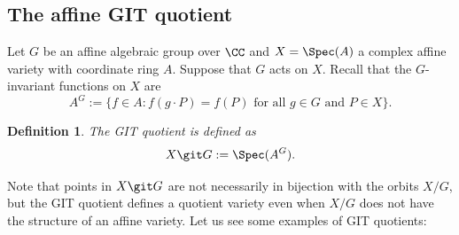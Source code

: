 \documentclass[12pt]{amsart}
\theoremstyle{plain}
\newtheorem{definition}[theorem]{Definition}
\begin{document}
\subsection{The affine GIT quotient}
Let $G$ be an affine algebraic group over $\CC$ and $X = \Spec(A)$ a complex affine variety with coordinate ring $A$.
Suppose that $G$ acts on $X$.
Recall that the $G$-invariant functions on $X$ are
$$A^G := \{f \in A : f(g \cdot P) = f(P) \text{ for all } g \in G \text{ and } P \in X\}.$$

\begin{definition}
The GIT quotient is defined as
$$X \git G := \Spec(A^G).$$
\end{definition}

Note that points in $X \git G$ are not necessarily in bijection with the orbits $X / G$, but the GIT quotient defines a quotient variety even when $X / G$ does not have the structure of an affine variety.
Let us see some examples of GIT quotients:
\end{document}
